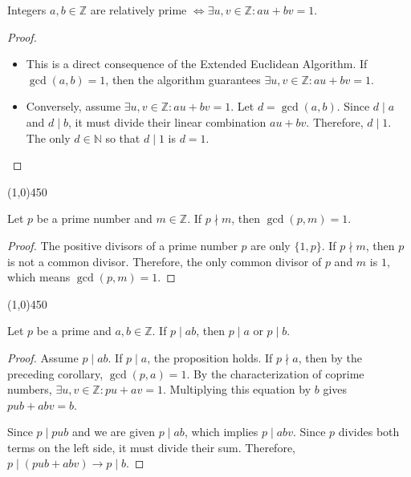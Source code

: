 \begin{proposition}
    Integers $a, b \in \mathbb{Z}$ are relatively prime $\iff \exists u, v \in \mathbb{Z} : a u + b v = 1$.
    \end{proposition}
    \begin{proof}
        \leavevmode
    \begin{itemize}
        \item[($\Rightarrow$)] This is a direct consequence of the Extended Euclidean Algorithm. If $\gcd(a, b) = 1$, then the algorithm guarantees $\exists u, v \in \mathbb{Z} : a u + b v = 1$.
        \item[($\Leftarrow$)] Conversely, assume $\exists u, v \in \mathbb{Z} : a u + b v = 1$. Let $d = \gcd(a, b)$. Since $d \mid a$ and $d \mid b$, it must divide their linear combination $a u + b v$. Therefore, $d \mid 1$. The only $d \in \mathbb{N}$ so that $d \mid 1$ is $d = 1$. \qedhere
    \end{itemize}
    \end{proof}
    
    \begin{center}
        \vspace{10pt}
        \line(1,0){450}
        \vspace{25pt}
    \end{center}
    
    \begin{corollary}
    Let $p$ be a prime number and $m \in \mathbb{Z}$. If $p \nmid m$, then $\gcd(p, m) = 1$.
    \end{corollary}
    \begin{proof}
    The positive divisors of a prime number $p$ are only $\{1, p\}$. If $p \nmid m$, then $p$ is not a common divisor. Therefore, the only common divisor of $p$ and $m$ is $1$, which means $\gcd(p, m) = 1$. \qedhere
    \end{proof}
    
    \begin{center}
        \vspace{10pt}
        \line(1,0){450}
        \vspace{25pt}
    \end{center}
    
    \begin{proposition}
    Let $p$ be a prime and $a, b \in \mathbb{Z}$. If $p \mid a b$, then $p \mid a$ or $p \mid b$.
    \end{proposition}
    \begin{proof}
    Assume $p \mid a b$. If $p \mid a$, the proposition holds. If $p \nmid a$, then by the preceding corollary, $\gcd(p, a) = 1$.
    By the characterization of coprime numbers, $\exists u, v \in \mathbb{Z} : p u + a v = 1$.
    Multiplying this equation by $b$ gives $p u b + a b v = b$.
    \par
    Since $p \mid p u b$ and we are given $p \mid a b$, which implies $p \mid a b v$.
    Since $p$ divides both terms on the left side, it must divide their sum. Therefore, $p \mid (p u b + a b v) \rightarrow p \mid b$. \qedhere
    \end{proof}
    

